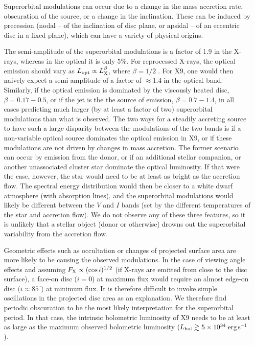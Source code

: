 \documentclass[a4paper,fleqn,usenatbib]{mnras}
\begin{document}
Superorbital modulations can occur due to a change in the mass accretion rate, obscuration of the source, or a change in the inclination. These can be induced by precession (nodal -- of the inclination of disc plane, or apsidal -- of an eccentric disc in a fixed plane), which can have a variety of physical origins.

The semi-amplitude of the superorbital modulations is a factor of 1.9 in the X-rays, whereas in the optical it is only 5\%. For reprocessed X-rays, the optical emission should vary as $L_{\rm opt} \propto L_{\rm X}^{\beta}$, where $\beta = 1/2$ \citep{1994A&A...290..133V}. For X9, one would then naively expect a semi-amplitude of a factor of $\approx 1.4$ in the optical band. Similarly, if the optical emission is dominated by the viscously heated disc, $\beta = 0.17-0.5$, or if the jet is the the source of emission, $\beta = 0.7-1.4$, in all cases predicting much larger (by at least a factor of two) superorbital modulations than what is observed. The two ways for a steadily accreting source to have such a large disparity between the modulations of the two bands is if a non-variable optical source dominates the optical emission in X9, or if these modulations are not driven by changes in mass accretion. The former scenario can occur by emission from the donor, or if an additional stellar companion, or another unassociated cluster star dominate the optical luminosity. If that were the case, however, the star would need to be at least as bright as the accretion flow. The spectral energy distribution would then be closer to a white dwarf atmosphere (with absorption lines), and the superorbital modulations would likely be different between the $V$ and $I$ bands (set by the different temperatures of the star and accretion flow). We do not observe any of these three features, so it is unlikely that a stellar object (donor or otherwise) drowns out the superorbital variability from the accretion flow. 

Geometric effects such as occultation or changes of projected surface area are more likely to be causing the observed modulations. In the case of viewing angle effects and assuming $F_{\rm X} \propto (\cos i)^{1/2}$ (if X-rays are emitted from close to the disc surface), a face-on disc ($i = 0$) at maximum flux would require an almost edge-on disc ($i \approx 85^\circ$) at minimum flux. It is therefore difficult to invoke simple oscillations in the projected disc area as an explanation. We therefore find periodic obscuration to be the most likely interpretation for the superorbital period. In that case, the intrinsic bolometric luminosity of X9 needs to be at least as large as the maximum observed bolometric luminosity ($L_{\rm bol} \gtrsim 5 \times 10^{34}$\,erg\,s$^{-1}$). 
\end{document}
